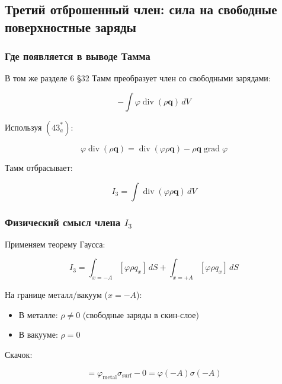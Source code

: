 \documentclass[a4paper,10pt]{article}
\newcommand{\modblock}[1]{\colorbox{modcolor!10}{\parbox{\dimexpr\linewidth-2\fboxsep}{#1}}}
\begin{document}
\modblock{

\subsection{Третий отброшенный член: сила на свободные поверхностные заряды}

\subsubsection{Где появляется в выводе Тамма}

В том же разделе 6 §32 Тамм преобразует член со свободными зарядами:

\begin{equation}
-\int \varphi\operatorname{div}(\rho\mathbf{q})\,dV
\label{eq:tamm_integral_3}
\end{equation}

Используя $(43^*_a)$:

\begin{equation}
\varphi\operatorname{div}(\rho\mathbf{q}) =
\operatorname{div}(\varphi\rho\mathbf{q}) -
\rho\mathbf{q}\operatorname{grad}\varphi
\label{eq:divergence_identity_3}
\end{equation}

Тамм отбрасывает:

\begin{equation}
\boxed{
I_3 = \int \operatorname{div}(\varphi\rho\mathbf{q})\,dV
}
\label{eq:discarded_term_3}
\end{equation}

\subsubsection{Физический смысл члена $I_3$}

Применяем теорему Гаусса:

\begin{equation}
I_3 = \int_{x=-A} [\varphi\rho q_x]\,dS + \int_{x=+A} [\varphi\rho q_x]\,dS
\label{eq:term_3_gauss}
\end{equation}

На границе металл/вакуум ($x = -A$):
\begin{itemize}
    \item В металле: $\rho \neq 0$ (свободные заряды в скин-слое)
    \item В вакууме: $\rho = 0$
\end{itemize}

Скачок:

\begin{equation}
[\varphi\rho] = \varphi_{\text{metal}}\sigma_{\text{surf}} - 0 = \varphi(-A)\sigma(-A)
\label{eq:jump_phi_rho}
\end{equation}

}
\end{document}
